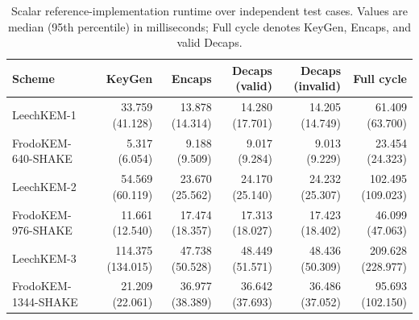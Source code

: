 \begin{table}[t]
\centering
\caption{Scalar reference-implementation runtime over independent test cases. Values are median (95th percentile) in milliseconds; Full cycle denotes KeyGen, Encaps, and valid Decaps.}
\label{tab:kem-runtime}
\begin{tabular}{lrrrrr}
\toprule
Scheme & KeyGen & Encaps & Decaps (valid) & Decaps (invalid) & Full cycle \\
\midrule
LeechKEM-1 & 33.759 (41.128) & 13.878 (14.314) & 14.280 (17.701) & 14.205 (14.749) & 61.409 (63.700) \\
FrodoKEM-640-SHAKE & 5.317 (6.054) & 9.188 (9.509) & 9.017 (9.284) & 9.013 (9.229) & 23.454 (24.323) \\
\addlinespace
LeechKEM-2 & 54.569 (60.119) & 23.670 (25.562) & 24.170 (25.140) & 24.232 (25.307) & 102.495 (109.023) \\
FrodoKEM-976-SHAKE & 11.661 (12.540) & 17.474 (18.357) & 17.313 (18.027) & 17.423 (18.402) & 46.099 (47.063) \\
\addlinespace
LeechKEM-3 & 114.375 (134.015) & 47.738 (50.528) & 48.449 (51.571) & 48.436 (50.309) & 209.628 (228.977) \\
FrodoKEM-1344-SHAKE & 21.209 (22.061) & 36.977 (38.389) & 36.642 (37.693) & 36.486 (37.052) & 95.693 (102.150) \\
\bottomrule
\end{tabular}
\end{table}
